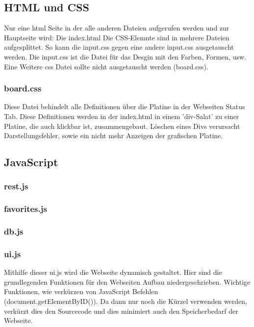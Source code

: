 \subsection{HTML und CSS}
Nur eine html Seite in der alle anderen Dateien aufgerufen werden und zur
Hauptseite wird: Die index.html\newline
Die CSS-Elemnte sind in mehrere Dateien aufgesplittet. So kann die input.css
gegen eine andere input.css ausgetauscht werden. Die input.css ist die Datei für
das Desgin mit den Farben, Formen, usw.\newline
Eine Weitere css Datei sollte nicht ausgetauscht werden (board.css).

\subsubsection{board.css}
Diese Datei behindelt alle Definitionen über die Platine in der Webseiten Status
Tab. Diese Definitionen werden in der index.html in einem 'div-Salat' zu einer
Platine, die auch klickbar ist, zusammengebaut. Löschen eines Divs verursacht
Darstellungsfehler, sowie ein nicht mehr Anzeigen der grafischen Platine.

\subsection{JavaScript}
\subsubsection{rest.js}
\subsubsection{favorites.js}
\subsubsection{db.js}
\subsubsection{ui.js}
Mithilfe dieser ui.js wird die Webseite dynamisch gestaltet. Hier sind die
grundlegenden Funktionen für den Webseiten Aufbau niedergeschrieben.\newline
Wichtige Funktionen, wie verkürzen von JavaScript Befehlen
(document.getElementByID()). Da dann nur noch die Kürzel verwenden werden,
verkürzt dies den Sourcecode und dies minimiert auch den Speicherbedarf der
Webseite.\newline


